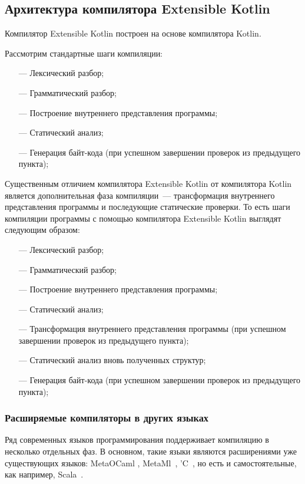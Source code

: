 \subsection{Архитектура компилятора Extensible Kotlin}
Компилятор Extensible Kotlin построен на основе компилятора Kotlin.

Рассмотрим стандартные шаги компиляции:
\begin{itemize}
\item[---] Лексический разбор;
\item[---] Грамматический разбор;
\item[---] Построение внутреннего представления программы;
\item[---] Статический анализ; \td
\item[---] Генерация байт-кода (при успешном завершении проверок из предыдущего пункта);
\end{itemize}

Существенным отличием компилятора Extensible Kotlin от компилятора Kotlin является дополнительная фаза компиляции~--- трансформация внутреннего представления программы  и последующие статические проверки. То есть шаги компиляции программы с помощью компилятора Extensible Kotlin выглядят следующим образом:
\begin{itemize}
\item[---] Лексический разбор;
\item[---] Грамматический разбор;
\item[---] Построение внутреннего представления программы;
\item[---] Статический анализ; \td
\item[---] Трансформация внутреннего представления программы (при успешном завершении проверок из предыдущего пункта);
\item[---] Статический анализ вновь полученных структур; \td
\item[---] Генерация байт-кода (при успешном завершении проверок из предыдущего пункта);
\end{itemize}

\subsubsection{Расширяемые компиляторы в других языках} %
Ряд современных языков программирования поддерживает компиляцию в несколько отдельных фаз.
В основном, такие языки являются расширениями уже существующих языков: MetaOCaml \td, MetaMl~\cite{metaml}, 'C~\cite{extendible-c}, но есть и самостоятельные, как например, Scala~\cite{scala-spec}. 

